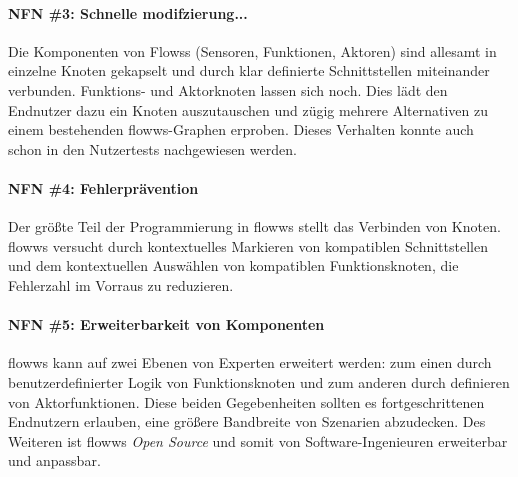 \paragraph{NFN \#3: Schnelle modifzierung...} Die Komponenten von Flowss (Sensoren, Funktionen, Aktoren) sind allesamt in einzelne Knoten gekapselt und durch klar definierte Schnittstellen miteinander verbunden. Funktions- und Aktorknoten lassen sich noch. Dies lädt den Endnutzer dazu ein Knoten auszutauschen und zügig mehrere Alternativen zu einem bestehenden flowws-Graphen erproben. Dieses Verhalten konnte auch schon in den Nutzertests nachgewiesen werden.

\paragraph{NFN \#4: Fehlerprävention} Der größte Teil der Programmierung in flowws stellt das Verbinden von Knoten. flowws versucht durch kontextuelles Markieren von kompatiblen Schnittstellen und dem kontextuellen Auswählen von kompatiblen Funktionsknoten, die Fehlerzahl im Vorraus zu reduzieren. 

\paragraph{NFN \#5: Erweiterbarkeit von Komponenten} flowws kann auf zwei Ebenen von Experten erweitert werden: zum einen durch benutzerdefinierter Logik von Funktionsknoten und zum anderen durch definieren von Aktorfunktionen. Diese beiden Gegebenheiten sollten es fortgeschrittenen Endnutzern erlauben, eine größere Bandbreite von Szenarien abzudecken. Des Weiteren ist flowws \textit{Open Source} und somit von Software-Ingenieuren erweiterbar und anpassbar.


